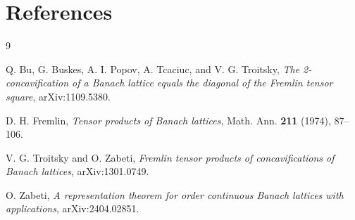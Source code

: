 \documentclass[11pt]{article}
\begin{document}
\section*{References}

\begin{thebibliography}{9}

Q. Bu, G. Buskes, A. I. Popov, A. Tcaciuc, and V. G. Troitsky,
\emph{The 2-concavification of a Banach lattice equals the diagonal of
the Fremlin tensor square}, arXiv:1109.5380.

D. H. Fremlin,
\emph{Tensor products of Banach lattices},
Math. Ann. \textbf{211} (1974), 87--106.

V. G. Troitsky and O. Zabeti,
\emph{Fremlin tensor products of concavifications of Banach lattices},
arXiv:1301.0749.

O. Zabeti,
\emph{A representation theorem for order continuous Banach lattices with
applications}, arXiv:2404.02851.

\end{thebibliography}
\end{document}
